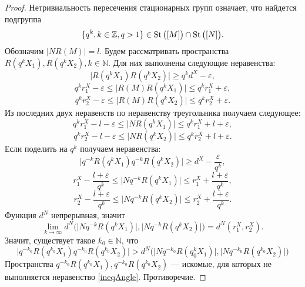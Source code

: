 \begin{proof}
  Нетривиальность пересечения стационарных групп означает, что
  найдется подгруппа \[
    \{q^k, k\in \mathbb{Z}, q> 1\} \in \operatorname{St}\big([M]\big) \cap \operatorname{St} \big([N]\big).
  \]
  Обозначим \( |N R(M)| = l \). Будем рассматривать пространства \(
  R(q^k X_1), R(q^k X_2), k \in \mathbb{N} \). Для них выполнены
  следующие неравенства:
  \[
    \big| R(q^k X_1) R(q^k X_2) \big| \ge q^k d^X - \varepsilon,
  \]
  \[
    q^k r_1^X - \varepsilon  \le\big | R(M) R(q^k X_1) \big| \le q^k
    r_1^X + \varepsilon ,
  \]
  \[
    q^k r_2^X - \varepsilon  \le\big | R(M) R(q^k X_2) \big| \le q^k
    r_2^X + \varepsilon .
  \]
  Из последних двух неравенств по неравенству треугольника получаем следующее:
  \[
    q^k r_1^X - l - \varepsilon \le \big|N R(q^k X_1) \big| \le q^k
    r_1^X + l + \varepsilon,
  \]
  \[
    q^k r_2^X - l - \varepsilon \le \big|N R(q^k X_2) \big| \le q^k
    r_2^X + l + \varepsilon.
  \]
  Если поделить на \( q^k \) получаем неравенства:
  \[
    \big| q^{-k}R(q^k X_1) q^{-k}R(q^k X_2) \big| \ge d^X -
    \frac{\varepsilon }{q^k},
  \]
  \[
    r_1^X - \frac{l + \varepsilon}{q^k} \le \big|N q^{-k}R(q^k X_1)
    \big| \le
    r_1^X + \frac{l + \varepsilon}{q^k},
  \]
  \[
    r_2^X - \frac{l + \varepsilon}{q^k} \le \big|N q^{-k}R(q^k X_2)
    \big| \le
    r_2^X + \frac{l + \varepsilon}{q^k}.
  \]
  Функция \( d^N \) непрерывная, значит
  \[
    \lim_{k \rightarrow \infty
    }d^N\Big(\big|N q^{-k}R(q^k X_1)
      \big|, \big|N q^{-k}R(q^k X_2)
    \big|\Big) = d^N(r_1^X, r_2^X).
  \]
  Значит, существует такое \( k_0 \in \mathbb{N} \), что
  \[
    \big| q^{-k_0}R(q^{k_0} X_1) q^{-k_0}R(q^{k_0} X_2) \big| >
    d^N\Big(\big|N q^{-k_0}R(q^k_0 X_1)
      \big|, \big|N q^{-k_0}R(q^{k_0} X_2)
    \big|\Big)
  \]
  Пространства \( q^{-k_0}R(q^{k_0}X_1), q^{-k_0}R(q^{k_0}X_2)\) ---
  искомые, для которых не выполняется неравенство \ref{ineqAngle}. Противоречие.
\end{proof}
